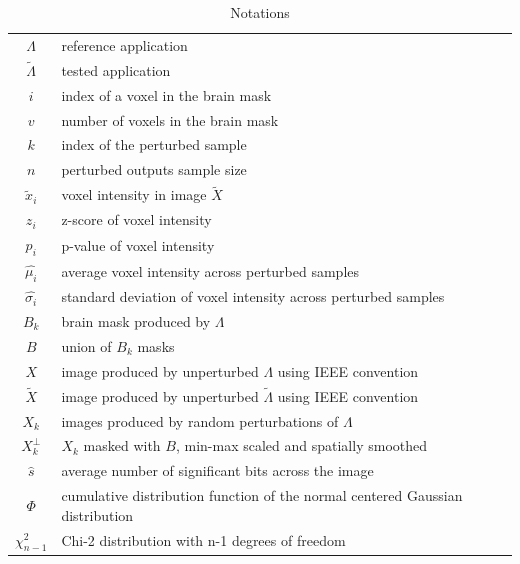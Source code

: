 \documentclass{article}
\begin{document}
\begin{table}
    \centering
    \begin{tabular}{c|l}
        $\Lambda$        & reference application                                                         \\
        $\tilde \Lambda$ & tested application                                                            \\
        $i$              & index of a voxel in the brain mask                                            \\
        $v$              & number of voxels in the brain mask                                            \\
        $k$              & index of the perturbed sample                                                 \\
        $n$              & perturbed outputs sample size                                                 \\
        $\tilde x_i$     & voxel intensity in image $\tilde X$                                           \\
        $z_i$            & z-score of voxel intensity                                                    \\
        $p_i$            & p-value of voxel intensity                                                    \\
        $\hat{\mu_i}$    & average voxel intensity across perturbed samples                              \\
        $\hat{\sigma_i}$ & standard deviation of voxel intensity across perturbed samples                \\
        $B_k$            & brain mask produced by $\Lambda$                                              \\
        $B$              & union of $B_k$ masks                                                          \\
        $X$              & image produced by unperturbed $\Lambda$ using IEEE convention                 \\
        $\tilde X$       & image produced by unperturbed $\tilde \Lambda$ using IEEE convention          \\
        $X_k$            & images produced by random perturbations of $\Lambda$                          \\
        $X_k^{\perp}$    & $X_k$ masked with $B$, min-max scaled and spatially smoothed                  \\
        $\hat{s}$        & average number of significant bits across the image                           \\
        $\Phi$           & cumulative distribution function of the normal centered Gaussian distribution \\
        $\chi^2_{n-1}$   & Chi-2 distribution with n-1 degrees of freedom                                \\
    \end{tabular}
    \caption{Notations}
    \label{tab:notations}
\end{table}
\end{document}
